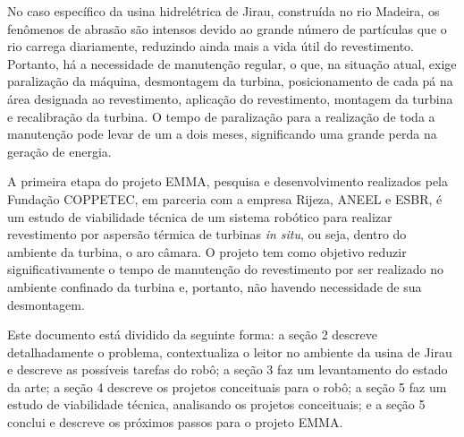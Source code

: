 No caso específico da usina hidrelétrica de Jirau, construída no rio Madeira,
os fenômenos de abrasão são intensos devido ao grande número
de partículas que o rio carrega diariamente, reduzindo ainda mais a vida útil do
revestimento.
Portanto, há a necessidade de manutenção regular, o que, na situação atual,
exige paralização da máquina, desmontagem da turbina, posicionamento de cada pá
na área designada ao revestimento, aplicação do revestimento, montagem da
turbina e recalibração da turbina. O tempo de paralização para a realização de
toda a manutenção pode levar de um a dois meses, significando uma grande perda
na geração de energia. 

A primeira etapa do projeto EMMA, pesquisa e desenvolvimento
realizados pela Fundação COPPETEC, em parceria com a empresa Rijeza, ANEEL e
ESBR, é um estudo de viabilidade técnica de um sistema robótico para realizar
revestimento por aspersão térmica de turbinas \textit{in situ}, ou seja, dentro
do ambiente da turbina, o aro câmara. O projeto tem como objetivo reduzir
significativamente o tempo de manutenção do revestimento por ser realizado no
ambiente confinado da turbina e, portanto, não havendo necessidade de sua
desmontagem.

Este documento está dividido da seguinte forma: a seção 2 descreve
detalhadamente o problema, contextualiza o leitor no ambiente da usina de
Jirau e descreve as possíveis tarefas do robô; a seção 3 faz um levantamento do
estado da arte; a seção 4 descreve os projetos conceituais para o robô; a seção
5 faz um estudo de viabilidade técnica, analisando os projetos conceituais; e a
seção 5 conclui e descreve os próximos passos para o projeto EMMA. 

